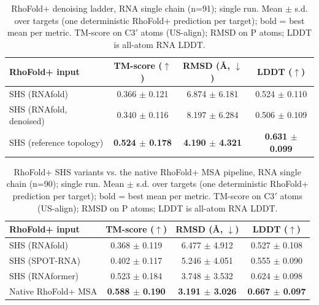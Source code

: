 \begin{table}[htbp]
\centering
\caption{RhoFold+ denoising ladder, RNA single chain (n=91); single run. Mean $\pm$ s.d. over targets (one deterministic RhoFold+ prediction per target); bold = best mean per metric. TM-score on C3$'$ atoms (US-align); RMSD on P atoms; LDDT is all-atom RNA LDDT.}
\label{tab:denoise_main_rf}
\begin{tabular}{lccc}
\toprule
RhoFold+ input & TM-score ($\uparrow$) & RMSD (\AA, $\downarrow$) & LDDT ($\uparrow$) \\
\midrule
SHS (RNAfold) & 0.366 $\pm$ 0.121 & 6.874 $\pm$ 6.181 & 0.524 $\pm$ 0.110 \\
SHS (RNAfold, denoised) & 0.340 $\pm$ 0.116 & 8.197 $\pm$ 6.284 & 0.506 $\pm$ 0.109 \\
SHS (reference topology) & \textbf{0.524 $\pm$ 0.178} & \textbf{4.190 $\pm$ 4.321} & \textbf{0.631 $\pm$ 0.099} \\
\bottomrule
\end{tabular}
\end{table}

\begin{table}[htbp]
\centering
\caption{RhoFold+ SHS variants vs. the native RhoFold+ MSA pipeline, RNA single chain (n=90); single run. Mean $\pm$ s.d. over targets (one deterministic RhoFold+ prediction per target); bold = best mean per metric. TM-score on C3$'$ atoms (US-align); RMSD on P atoms; LDDT is all-atom RNA LDDT.}
\label{tab:rf_rna_single_chain_native_msa}
\begin{tabular}{lccc}
\toprule
RhoFold+ input & TM-score ($\uparrow$) & RMSD (\AA, $\downarrow$) & LDDT ($\uparrow$) \\
\midrule
SHS (RNAfold) & 0.368 $\pm$ 0.119 & 6.477 $\pm$ 4.912 & 0.527 $\pm$ 0.108 \\
SHS (SPOT-RNA) & 0.402 $\pm$ 0.117 & 5.246 $\pm$ 4.051 & 0.555 $\pm$ 0.090 \\
SHS (RNAformer) & 0.523 $\pm$ 0.184 & 3.748 $\pm$ 3.532 & 0.624 $\pm$ 0.098 \\
Native RhoFold+ MSA & \textbf{0.588 $\pm$ 0.190} & \textbf{3.191 $\pm$ 3.026} & \textbf{0.667 $\pm$ 0.097} \\
\bottomrule
\end{tabular}
\end{table}

